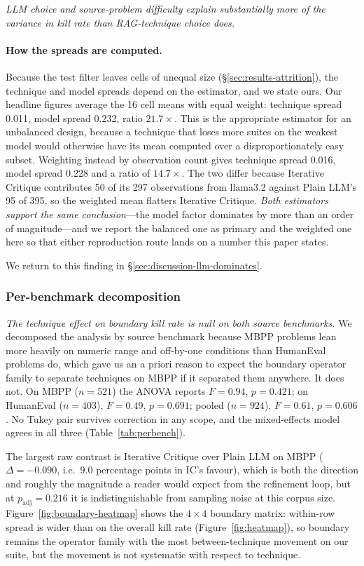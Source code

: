 \documentclass[smallextended]{svjour3}
\begin{document}
\emph{LLM choice and source-problem difficulty explain substantially
more of the variance in kill rate than RAG-technique choice does.}

\paragraph{How the spreads are computed.} Because the test filter
leaves cells of unequal size (\S\ref{sec:results-attrition}), the
technique and model spreads depend on the estimator, and we state ours.
Our headline figures average the 16 cell means with equal weight:
technique spread 0.011, model spread 0.232, ratio $21.7\times$. This is
the appropriate estimator for an unbalanced design, because a
technique that loses more suites on the weakest model would otherwise
have its mean computed over a disproportionately easy subset.
Weighting instead by observation count gives technique spread 0.016,
model spread 0.228 and a ratio of $14.7\times$. The two differ
because Iterative Critique contributes 50 of its 297 observations
from llama3.2 against Plain LLM's 95 of 395, so the weighted mean
flatters Iterative Critique. \emph{Both estimators support the same
conclusion}---the model factor dominates by more than an order of
magnitude---and we report the balanced one as primary and the
weighted one here so that either reproduction route lands on a
number this paper states.

We return to this finding in \S\ref{sec:discussion-llm-dominates}.

\subsubsection{Per-benchmark decomposition}\label{sec:results-perbenchmark}

\emph{The technique effect on boundary kill rate is null on both
source benchmarks.} We decomposed the analysis by source benchmark
because MBPP problems lean more heavily on numeric range and
off-by-one conditions than HumanEval problems do, which gave us an
a priori reason to expect the boundary operator family to separate
techniques on MBPP if it separated them anywhere. It does not. On MBPP
($n = 521$) the ANOVA reports $F = 0.94$, $p = 0.421$; on HumanEval
($n = 403$), $F = 0.49$, $p = 0.691$; pooled ($n = 924$),
$F = 0.61$, $p = 0.606$. No Tukey pair survives correction in any
scope, and the mixed-effects model agrees in all three
(Table~\ref{tab:perbench}).

The largest raw contrast is Iterative Critique over Plain LLM on
MBPP ($\Delta = -0.090$, i.e.\ 9.0 percentage points in IC's
favour), which is both the direction and roughly the magnitude a
reader would expect from the refinement loop, but at
$p_{\mathrm{adj}} = 0.216$ it is indistinguishable from sampling
noise at this corpus size. Figure~\ref{fig:boundary-heatmap} shows
the $4 \times 4$ boundary matrix: within-row spread is wider than on
the overall kill rate (Figure~\ref{fig:heatmap}), so boundary
remains the operator family with the most between-technique movement on
our suite, but the movement is not systematic with respect to
technique.
\end{document}
